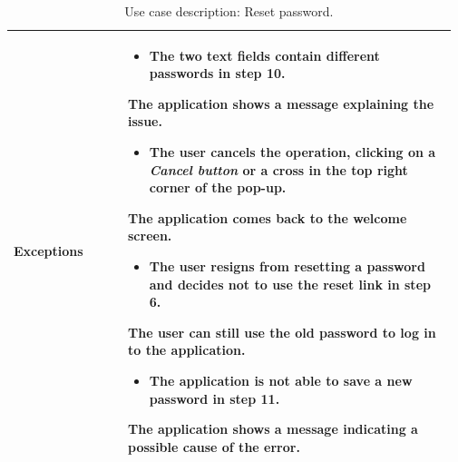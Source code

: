 \begin{table}[H]
\begin{tabular}{@{}p{0.25\linewidth} p{0.72\linewidth}@{}}
		\textbf{Exceptions}         & \begin{itemize}[leftmargin=.4cm,noitemsep,topsep=0pt,before=\vspace{-3mm}]
		   \item The two text fields contain different passwords in step 10.
		\end{itemize}
		The application shows a message explaining the issue.
	    \begin{itemize}[leftmargin=.4cm,noitemsep,topsep=0pt]
		   \item The user cancels the operation, clicking on a \textit{Cancel button} or a cross in the top right corner of the pop-up.
		\end{itemize}
		The application comes back to the welcome screen.
	    \begin{itemize}[leftmargin=.4cm,noitemsep,topsep=0pt]
		   \item The user resigns from resetting a password and decides not to use the reset link in step 6.
		\end{itemize}
		The user can still use the old password to log in to the application.
	    \begin{itemize}[leftmargin=.4cm,noitemsep,topsep=0pt]
		   \item The application is not able to save a new password in step 11.
		\end{itemize}
		The application shows a message indicating a possible cause of the error.
		\\\bottomrule
	\end{tabular}
	\caption{Use case description: Reset password.} 
\end{table}

